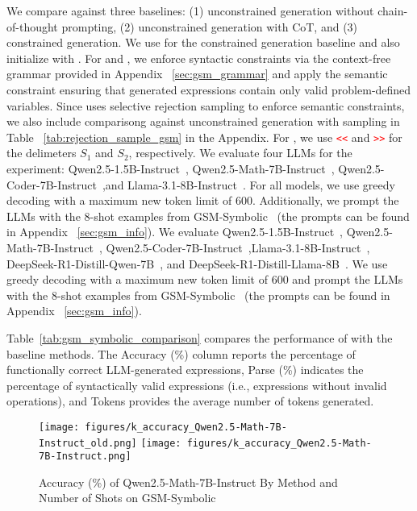 We compare \Tool{} against three baselines: (1) unconstrained generation without chain-of-thought prompting, (2) unconstrained generation with CoT, and (3) constrained generation. We use \itergen{} for the constrained generation baseline and also initialize \Tool{} with \itergen{}. For \itergen{} and \Tool{}, we enforce syntactic constraints via the context-free grammar provided in Appendix ~\ref{sec:gsm_grammar} and apply the semantic constraint ensuring that generated expressions contain only valid problem-defined variables. Since \itergen{} uses selective rejection sampling to enforce semantic constraints, we also include comparisong against unconstrained generation with sampling in Table ~\ref{tab:rejection_sample_gsm} in the Appendix. For \Tool{}, we use \textcolor{red}{\texttt{<<}} and  \textcolor{red}{\texttt{>>}} for the delimeters $S_1$ and $S_2$, respectively.
{We evaluate four LLMs for the experiment: Qwen2.5-1.5B-Instruct~\cite{qwen2.5}, Qwen2.5-Math-7B-Instruct~\cite{qwen2.5}, Qwen2.5-Coder-7B-Instruct~\cite{qwen2.5},and Llama-3.1-8B-Instruct~\cite{llamamodels}. For all models, we use greedy decoding with a maximum new token limit of 600. Additionally, we prompt the LLMs with the 8-shot examples from GSM-Symbolic~\cite{mirzadeh2024gsmsymbolicunderstandinglimitationsmathematical} (the prompts can be found in Appendix ~\ref{sec:gsm_info}).}
{We evaluate Qwen2.5-1.5B-Instruct~\citep{qwen2.5}, Qwen2.5-Math-7B-Instruct~\citep{qwen2.5}, Qwen2.5-Coder-7B-Instruct~\citep{qwen2.5},Llama-3.1-8B-Instruct~\citep{llamamodels}, DeepSeek-R1-Distill-Qwen-7B~\citep{deepseekr1}, and DeepSeek-R1-Distill-Llama-8B~\citep{deepseekr1}. We use greedy decoding with a maximum new token limit of 600 and prompt the LLMs with the 8-shot examples from GSM-Symbolic~\citep{mirzadeh2024gsmsymbolicunderstandinglimitationsmathematical} (the prompts can be found in Appendix ~\ref{sec:gsm_info}).}

Table~\ref{tab:gsm_symbolic_comparison} compares the performance of \Tool{} with the baseline methods. The Accuracy (\%) column reports the percentage of functionally correct LLM-generated expressions, Parse (\%) indicates the percentage of syntactically valid expressions (i.e., expressions without invalid operations), and Tokens provides the average number of tokens generated. 

\begin{figure}[t]
    \centering
    {\texttt{[image: figures/k\_accuracy\_Qwen2.5-Math-7B-Instruct\_old.png]}}
    {\texttt{[image: figures/k\_accuracy\_Qwen2.5-Math-7B-Instruct.png]}}
    \caption{Accuracy (\%) of Qwen2.5-Math-7B-Instruct By Method and Number of Shots on GSM-Symbolic}
    \label{fig:gsm_ks}
\end{figure}


